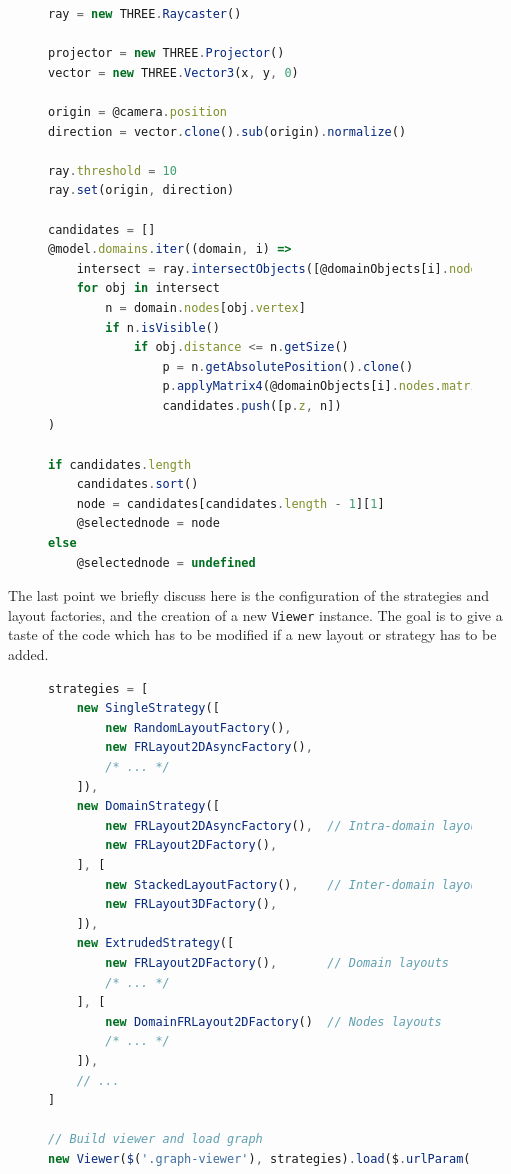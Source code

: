 \begin{figure}
\begin{lstlisting}[caption={Raytracing technique used to detect the active node.},label=lst:raytracing,language=javascript]
ray = new THREE.Raycaster()

projector = new THREE.Projector()
vector = new THREE.Vector3(x, y, 0)

origin = @camera.position
direction = vector.clone().sub(origin).normalize()

ray.threshold = 10
ray.set(origin, direction)

candidates = []
@model.domains.iter((domain, i) =>
    intersect = ray.intersectObjects([@domainObjects[i].nodes])
    for obj in intersect
        n = domain.nodes[obj.vertex]
        if n.isVisible()
            if obj.distance <= n.getSize()
                p = n.getAbsolutePosition().clone()
                p.applyMatrix4(@domainObjects[i].nodes.matrixWorld)
                candidates.push([p.z, n])
)

if candidates.length
    candidates.sort()
    node = candidates[candidates.length - 1][1]
    @selectednode = node
else
    @selectednode = undefined
\end{lstlisting}
\end{figure}

The last point we briefly discuss here is the configuration of the strategies and layout factories, and the creation of a new \texttt{Viewer} instance. The goal is to give a taste of the code which has to be modified if a new layout or strategy has to be added.

\begin{figure}
\begin{lstlisting}[caption={Construction of a viewer instance.},label=lst:viewer,language=javascript]
strategies = [
    new SingleStrategy([
        new RandomLayoutFactory(),
        new FRLayout2DAsyncFactory(),
        /* ... */
    ]),
    new DomainStrategy([
        new FRLayout2DAsyncFactory(),  // Intra-domain layouts
        new FRLayout2DFactory(),
    ], [
        new StackedLayoutFactory(),    // Inter-domain layouts
        new FRLayout3DFactory(),
    ]),
    new ExtrudedStrategy([
        new FRLayout2DFactory(),       // Domain layouts
        /* ... */
    ], [
        new DomainFRLayout2DFactory()  // Nodes layouts
        /* ... */
    ]),
    // ...
]

// Build viewer and load graph
new Viewer($('.graph-viewer'), strategies).load($.urlParam('url'))
\end{lstlisting}
\end{figure}

